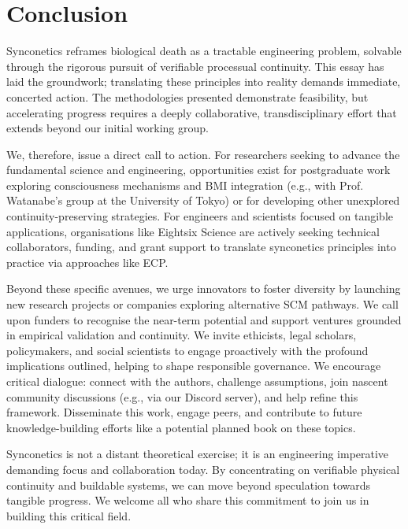 \documentclass[10pt]{article}
\begin{document}
\begin{sloppypar}
  \section{Conclusion}
  \label{sec:conclusion}

  Synconetics reframes biological death as a tractable engineering problem, solvable through the rigorous pursuit of verifiable processual continuity. This essay has laid the groundwork; translating these principles into reality demands immediate, concerted action. The methodologies presented demonstrate feasibility, but accelerating progress requires a deeply collaborative, transdisciplinary effort that extends beyond our initial working group.

  We, therefore, issue a direct call to action. For researchers seeking to advance the fundamental science and engineering, opportunities exist for postgraduate work exploring consciousness mechanisms and BMI integration (e.g., with Prof. Watanabe’s group at the University of Tokyo) or for developing other unexplored continuity-preserving strategies. For engineers and scientists focused on tangible applications, organisations like Eightsix Science are actively seeking technical collaborators, funding, and grant support to translate synconetics principles into practice via approaches like ECP.

  Beyond these specific avenues, we urge innovators to foster diversity by launching new research projects or companies exploring alternative SCM pathways. We call upon funders to recognise the near-term potential and support ventures grounded in empirical validation and continuity. We invite ethicists, legal scholars, policymakers, and social scientists to engage proactively with the profound implications outlined, helping to shape responsible governance. We encourage critical dialogue: connect with the authors, challenge assumptions, join nascent community discussions (e.g., via our Discord server), and help refine this framework. Disseminate this work, engage peers, and contribute to future knowledge-building efforts like a potential planned book on these topics.

  Synconetics is not a distant theoretical exercise; it is an engineering imperative demanding focus and collaboration today. By concentrating on verifiable physical continuity and buildable systems, we can move beyond speculation towards tangible progress. We welcome all who share this commitment to join us in building this critical field.


  \pagebreak
  
  
  \nocite{*}

\end{sloppypar}
\end{document}
